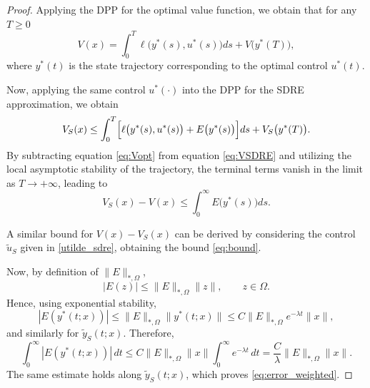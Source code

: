 \documentclass[10pt,a4paper]{amsart}
\begin{document}
\begin{proof}


Applying the DPP for the optimal value function, we obtain that for any \(T\ge 0\)
\begin{equation}\label{eq:Vopt}
V(x)=\int_0^T \ell\bigl(y^*(s),u^*(s)\bigr)ds+V\bigl(y^*(T)\bigr),
\end{equation}
where \(y^*(t)\) is the state trajectory corresponding to the optimal control \(u^*(t)\).

Now, applying the same control \(u^*(\cdot)\) into the DPP for the SDRE approximation, we obtain
\begin{equation}\label{eq:VSDRE}
V_S(x)\le \int_0^T \Bigl[\ell\bigl(y^*(s),u^*(s)\bigr)+E\bigl(y^*(s)\bigr)\Bigr]ds+V_S\bigl(y^*(T)\bigr).
\end{equation}
By subtracting equation \eqref{eq:Vopt} from equation \eqref{eq:VSDRE} and utilizing the local asymptotic stability of the trajectory, the terminal terms vanish in the limit as $T \rightarrow + \infty$, leading to
\[
V_S(x)-V(x)\le \int_0^\infty E\bigl(y^*(s)\bigr)ds.
\]

A similar bound for $V(x)-V_S(x)$ can be derived by considering the control $\tilde{u}_{S}$ given in \eqref{utilde_sdre}, obtaining the bound \eqref{eq:bound}.


Now, by definition of $\|E\|_{*,\Omega}$,
\[
|E(z)|\le \|E\|_{*,\Omega}\|z\|,
\qquad z\in\Omega.
\]
Hence, using exponential stability,
\[
|E(y^*(t;x))|
\le
\|E\|_{*,\Omega}\|y^*(t;x)\|
\le
C \|E\|_{*,\Omega} e^{-\lambda t}\|x\|,
\]
and similarly for $\tilde y_S(t;x)$. Therefore,
\[
\int_0^\infty |E(y^*(t;x))|\,dt
\le
C \|E\|_{*,\Omega}\|x\|
\int_0^\infty e^{-\lambda t}\,dt
=
\frac{C}{\lambda}\|E\|_{*,\Omega}\|x\|.
\]
The same estimate holds along $\tilde y_S(t;x)$, which proves
\eqref{eq:error_weighted}.

 
\end{proof}
\end{document}
